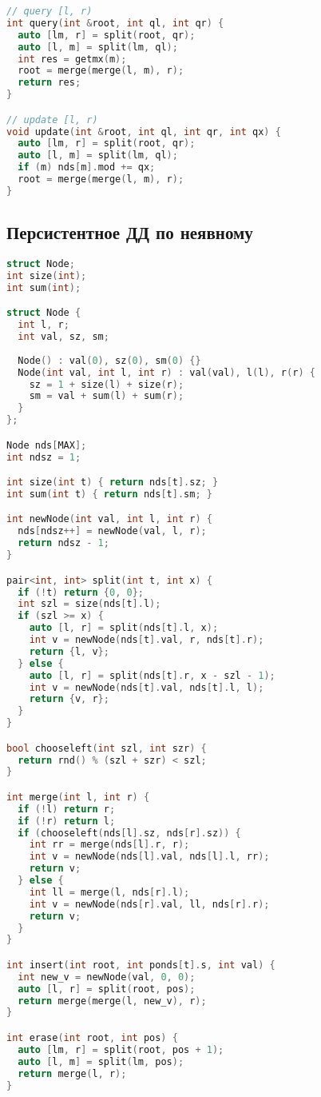 \documentclass[9pt,a4paper,landscape,twosided]{extarticle}
\begin{document}
\begin{multicols*}{3}
\begin{lstlisting}[language=C++]
// query [l, r)
int query(int &root, int ql, int qr) {
  auto [lm, r] = split(root, qr);
  auto [l, m] = split(lm, ql);
  int res = getmx(m);
  root = merge(merge(l, m), r);
  return res;
}

// update [l, r)
void update(int &root, int ql, int qr, int qx) {
  auto [lm, r] = split(root, qr);
  auto [l, m] = split(lm, ql);
  if (m) nds[m].mod += qx;
  root = merge(merge(l, m), r);
}

\end{lstlisting}

\subsection{Персистентное ДД по неявному}
\begin{lstlisting}[language=C++]
struct Node;
int size(int);
int sum(int);

struct Node {
  int l, r;
  int val, sz, sm;
    
  Node() : val(0), sz(0), sm(0) {}
  Node(int val, int l, int r) : val(val), l(l), r(r) {
    sz = 1 + size(l) + size(r);
    sm = val + sum(l) + sum(r);
  }
};

Node nds[MAX];
int ndsz = 1;

int size(int t) { return nds[t].sz; }
int sum(int t) { return nds[t].sm; }

int newNode(int val, int l, int r) {
  nds[ndsz++] = newNode(val, l, r);
  return ndsz - 1;
}

pair<int, int> split(int t, int x) {
  if (!t) return {0, 0};
  int szl = size(nds[t].l);
  if (szl >= x) {
    auto [l, r] = split(nds[t].l, x);
    int v = newNode(nds[t].val, r, nds[t].r);
    return {l, v};
  } else {
    auto [l, r] = split(nds[t].r, x - szl - 1);
    int v = newNode(nds[t].val, nds[t].l, l);
    return {v, r};
  }
}

bool chooseleft(int szl, int szr) {
  return rnd() % (szl + szr) < szl;
}

int merge(int l, int r) {
  if (!l) return r;
  if (!r) return l;
  if (chooseleft(nds[l].sz, nds[r].sz)) {
    int rr = merge(nds[l].r, r);
    int v = newNode(nds[l].val, nds[l].l, rr);
    return v;
  } else {
    int ll = merge(l, nds[r].l);
    int v = newNode(nds[r].val, ll, nds[r].r);
    return v;
  }
}

int insert(int root, int ponds[t].s, int val) {
  int new_v = newNode(val, 0, 0);
  auto [l, r] = split(root, pos);
  return merge(merge(l, new_v), r);
}

int erase(int root, int pos) {
  auto [lm, r] = split(root, pos + 1);
  auto [l, m] = split(lm, pos);
  return merge(l, r);
}


\end{lstlisting}
\end{multicols*}
\end{document}
